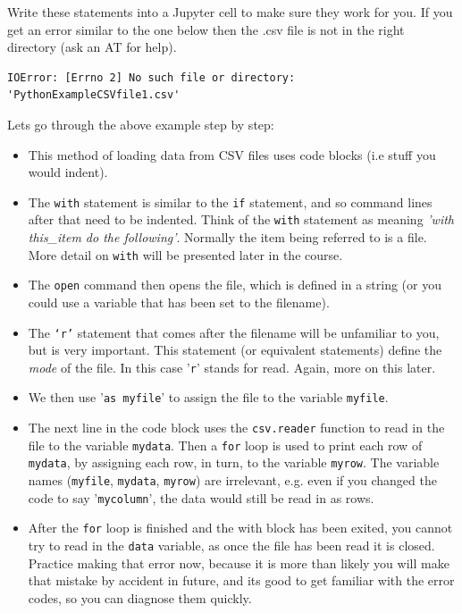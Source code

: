 Write these statements into a Jupyter cell to make sure they work for you. If you get an error similar to the one below then the .csv file is not in the right directory (ask an AT for help).

\begin{lstlisting}[style=PY_out]
IOError: [Errno 2] No such file or directory: 'PythonExampleCSVfile1.csv'
\end{lstlisting}

Lets go through the above example step by step: 

\begin{itemize}

\item This method of loading data from CSV files uses code blocks (i.e stuff you would indent). 

\item The {\tt with} statement is similar to the {\tt if} statement, and so command lines after that need to be indented.  Think of the {\tt with} statement as meaning {\it 'with this\_item do the following'}. Normally the item being referred to is a file. More detail on \texttt{with} will be presented later in the course.

\item The {\tt open} command then opens the file, which is defined in a string (or you could use a variable that has been set to the filename).

\item The {\tt `r'} statement that comes after the filename will be unfamiliar to you, but is very important. This statement (or equivalent statements) define the {\it mode} of the file. In this case '\texttt{r}' stands for read. Again, more on this later.

\item We then use '\texttt{as myfile}' to assign the  file to the variable \texttt{myfile}.

\item The next line in the code block uses the {\tt csv.reader} function to read in the file to the variable \texttt{mydata}. Then a {\tt for} loop is used to print each row of \texttt{mydata}, by assigning each row, in turn, to the variable {\tt myrow}. The variable names (\texttt{myfile}, \texttt{mydata}, {\tt myrow}) are irrelevant, e.g. even if you changed the code to say '\texttt{mycolumn}', the data would still be read in as rows. 

\item After the {\tt for} loop is finished and the with block has been exited, you cannot try to read in the \texttt{data} variable, as once the file has been read it is closed. Practice making that error now, because it is more than likely you will make that mistake by accident in future, and its good to get familiar with the error codes, so you can diagnose them quickly.

\end{itemize}

